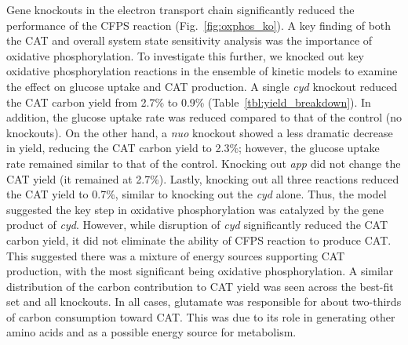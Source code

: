 \documentclass[12pt]{article}
\begin{document}
Gene knockouts in the electron transport chain significantly reduced the performance of the CFPS reaction (Fig.~\ref{fig:oxphos_ko}).
A key finding of both the CAT and overall system state sensitivity analysis was the importance of oxidative phosphorylation.
To investigate this further, we knocked out key oxidative phosphorylation reactions in the ensemble of kinetic models to examine the effect on glucose uptake and CAT production.
A single \textit{cyd} knockout reduced the CAT carbon yield from 2.7\% to 0.9\% (Table~\ref{tbl:yield_breakdown}).
In addition, the glucose uptake rate was reduced compared to that of the control (no knockouts).
On the other hand, a \textit{nuo} knockout showed a less dramatic decrease in yield,
reducing the CAT carbon yield to 2.3\%; however, the glucose uptake rate remained similar to that of the control.
Knocking out \textit{app} did not change the CAT yield (it remained at 2.7\%).
Lastly, knocking out all three reactions reduced the CAT yield to 0.7\%, similar to knocking out the \textit{cyd} alone.
Thus, the model suggested the key step in oxidative phosphorylation was catalyzed by the gene product of \textit{cyd}.
However, while disruption of \textit{cyd} significantly reduced the CAT carbon yield, it did not eliminate the ability of CFPS reaction to produce CAT.
This suggested there was a mixture of energy sources supporting CAT production, with the most significant being oxidative phosphorylation.
A similar distribution of the carbon contribution to CAT yield was seen across the best-fit set and all knockouts.
In all cases, glutamate was responsible for about two-thirds of carbon consumption toward CAT.
This was due to its role in generating other amino acids and as a possible energy source for metabolism.
\end{document}

